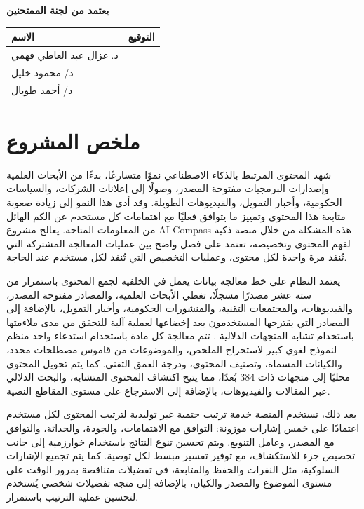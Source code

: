 \begin{Arabic}
\begin{center}
\vspace{0.9cm}
{\large\bfseries يعتمد من لجنة الممتحنين}

\vspace{0.6cm}
\begin{tabular}{|p{7cm}|p{6cm}|}
\hline
\textbf{الاسم} & \textbf{التوقيع} \\
\hline
د. غزال عبد العاطي فهمي & \\[1.1cm]
\hline
د/ محمود خليل & \\[1.1cm]
\hline
د/ أحمد طوبال & \\[1.1cm]
\hline
\end{tabular}

\end{center}
\clearpage

\chapter*{ملخص المشروع}

شهد المحتوى المرتبط بالذكاء الاصطناعي نموًا متسارعًا، بدءًا من الأبحاث العلمية وإصدارات البرمجيات مفتوحة المصدر، وصولًا إلى إعلانات الشركات، والسياسات الحكومية، وأخبار التمويل، والفيديوهات الطويلة. وقد أدى هذا النمو إلى زيادة صعوبة متابعة هذا المحتوى وتمييز ما يتوافق فعليًا مع اهتمامات كل مستخدم عن الكم الهائل من المعلومات المتاحة. يعالج مشروع AI Compass هذه المشكلة من خلال منصة ذكية لفهم المحتوى وتخصيصه، تعتمد على فصل واضح بين عمليات المعالجة المشتركة التي تُنفذ مرة واحدة لكل محتوى، وعمليات التخصيص التي تُنفذ لكل مستخدم عند الحاجة.

يعتمد النظام على خط معالجة بيانات  يعمل في الخلفية لجمع المحتوى باستمرار من ستة عشر مصدرًا مسجلًا، تغطي الأبحاث العلمية، والمصادر مفتوحة المصدر، والفيديوهات، والمجتمعات التقنية، والمنشورات الحكومية، وأخبار التمويل، بالإضافة إلى المصادر التي يقترحها المستخدمون بعد إخضاعها لعملية آلية للتحقق من مدى ملاءمتها باستخدام تشابه المتجهات الدلالية . تتم معالجة كل مادة باستخدام استدعاء واحد منظم لنموذج لغوي كبير  لاستخراج الملخص، والموضوعات من قاموس مصطلحات محدد، والكيانات المسماة، وتصنيف المحتوى، ودرجة العمق التقني. كما يتم تحويل المحتوى محليًا إلى متجهات ذات 384 بُعدًا، مما يتيح اكتشاف المحتوى المتشابه، والبحث الدلالي عبر المقالات والفيديوهات، بالإضافة إلى الاسترجاع على مستوى المقاطع النصية.

بعد ذلك، تستخدم المنصة خدمة ترتيب حتمية  غير توليدية لترتيب المحتوى لكل مستخدم اعتمادًا على خمس إشارات موزونة: التوافق مع الاهتمامات، والجودة، والحداثة، والتوافق مع المصدر، وعامل التنويع. ويتم تحسين تنوع النتائج باستخدام خوارزمية  إلى جانب تخصيص جزء للاستكشاف، مع توفير تفسير مبسط لكل توصية. كما يتم تجميع الإشارات السلوكية، مثل النقرات والحفظ والمتابعة، في تفضيلات متناقصة بمرور الوقت على مستوى الموضوع والمصدر والكيان، بالإضافة إلى متجه تفضيلات شخصي يُستخدم لتحسين عملية الترتيب باستمرار.


\end{Arabic}
